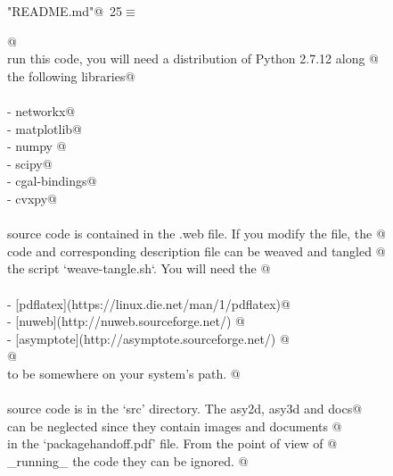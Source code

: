 \documentclass[10pt, english, oneside]{report}
\begin{document}
\begin{appendices}
\begin{flushleft} \small\label{scrap22}\raggedright\small
{} \verb@"README.md"@\nobreak\ {\footnotesize {25}}$\equiv$
\vspace{-1ex}
\begin{list}{}{} \item
\mbox{}\verb@    @\\
\mbox{}\verb@To run this code, you will need a distribution of Python 2.7.12 along @\\
\mbox{}\verb@with the following libraries@\\
\mbox{}\verb@@\\
\mbox{}\verb@- networkx@\\
\mbox{}\verb@- matplotlib@\\
\mbox{}\verb@- numpy @\\
\mbox{}\verb@- scipy@\\
\mbox{}\verb@- cgal-bindings@\\
\mbox{}\verb@- cvxpy@\\
\mbox{}\verb@@\\
\mbox{}\verb@All source code is contained in the .web file. If you modify the file, the @\\
\mbox{}\verb@resulting code and corresponding description file can be weaved and tangled @\\
\mbox{}\verb@with the script `weave-tangle.sh`. You will need the @\\
\mbox{}\verb@@\\
\mbox{}\verb@- [pdflatex](https://linux.die.net/man/1/pdflatex)@\\
\mbox{}\verb@- [nuweb](http://nuweb.sourceforge.net/) @\\
\mbox{}\verb@- [asymptote](http://asymptote.sourceforge.net/) @\\
\mbox{}\verb@  @\\
\mbox{}\verb@executables to be somewhere on your system's path. @\\
\mbox{}\verb@@\\
\mbox{}\verb@All source code is in the `src' directory. The asy2d, asy3d and docs@\\
\mbox{}\verb@folders can be neglected since they contain images and documents @\\
\mbox{}\verb@referenced in the `packagehandoff.pdf' file. From the point of view of @\\
\mbox{}\verb@_running_ the code they can be ignored. @\\
\mbox{}\verb@@\\
\mbox{}\verb@@\\
\mbox{}\verb@@\\
\mbox{}\verb@@{\NWsep}
\end{list}
\vspace{-1.5ex}
\footnotesize
\begin{list}{}{\setlength{\itemsep}{-\parsep}\setlength{\itemindent}{-\leftmargin}}


\end{list}
\end{flushleft}
\end{appendices}
\end{document}
